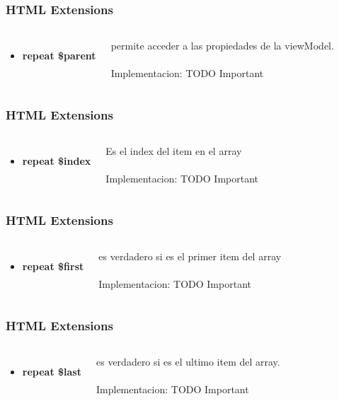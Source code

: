 \documentclass{beamer}
\begin{document}
\begin{frame}
\frametitle{HTML Extensions}
\begin{columns}[c]
\begin{itemize}
\item \textbf{repeat \$parent}
\end{itemize}

permite acceder a las propiedades de la viewModel.
\\~\\
Implementacion: TODO Important
\end{columns}
\end{frame}
\begin{frame}
\frametitle{HTML Extensions}
\begin{columns}[c]
\begin{itemize}
\item \textbf{repeat \$index}
\end{itemize}

Es el index del item en el array
\\~\\
Implementacion: TODO Important
\end{columns}
\end{frame}
\begin{frame}
\frametitle{HTML Extensions}
\begin{columns}[c]
\begin{itemize}
\item \textbf{repeat \$first}
\end{itemize}

es verdadero si es el primer item del array
\\~\\
Implementacion: TODO Important
\end{columns}
\end{frame}
\begin{frame}
\frametitle{HTML Extensions}
\begin{columns}[c]
\begin{itemize}
\item \textbf{repeat \$last}
\end{itemize}

es verdadero si es el ultimo item del array.
\\~\\
Implementacion: TODO Important
\end{columns}
\end{frame}
\end{document}
